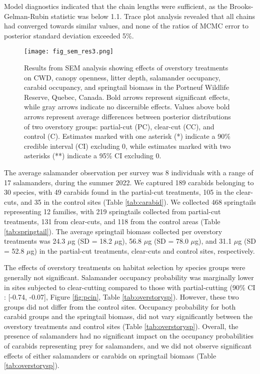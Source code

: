 Model diagnostics indicated that the chain lengths were sufficient, as the Brooks-Gelman-Rubin statistic was below 1.1. 
Trace plot analysis revealed that all chains had converged towards similar values, and none of the ratios of MCMC error to posterior standard deviation exceeded 5\%.

\vspace{10pt}

\begin{figure}[ht]
	\centering
	\texttt{[image: fig\_sem\_res3.png]}
	\caption[Results from structural equation modeling analysis revealing effects of overstory treatments on coarse woody debris volume,
  canopy openness, litter depth, salamander occupancy, carabid occupancy, and springtail biomass.]
  {Results from SEM analysis showing effects of overstory treatments on CWD, 
  canopy openness, litter depth, salamander occupancy, carabid occupancy, and springtail biomass in the Portneuf Wildlife Reserve, 
  Quebec, Canada. Bold arrows represent significant effects, while gray arrows indicate no discernible effects. 
  Values above bold arrows represent average differences between posterior distributions of two overstory groups: 
  partial-cut (PC), clear-cut (CC), and control (C). Estimates marked with one asterisk (*) 
  indicate a 90\% credible interval (CI) excluding 0, while estimates marked with two asterisks (**) indicate a 95\% CI excluding 0.}
	\label{fig:SEMres}
\end{figure}  

\vspace{10pt}

The average salamander observation per survey was 8 individuals with a range of 17 salamanders, during the summer 2022.
We captured 189 carabids belonging to 30 species, with 49 carabids found in the partial-cut treatments, 105 in the clear-cuts, and 35 in the control sites (Table \ref{tab:carabid}). 
We collected 468 springtails representing 12 families, with 219 springtails collected from partial-cut treatments, 131 from clear-cuts, and 118 from the control areas (Table \ref{tab:springtail}). 
The average springtail biomass collected per overstory treatments was 24.3 $\mu$g (SD = 18.2 $\mu$g), 56.8 $\mu$g (SD = 78.0 $\mu$g), and 31.1 $\mu$g (SD = 52.8 $\mu$g) in the partial-cut treatments, clear-cuts and control sites, respectively.

The effects of overstory treatments on habitat selection by species groups were generally not significant. 
Salamander occupancy probability was marginally lower in sites subjected to clear-cutting compared to those with partial-cutting (90\% CI : [-0.74, -0.07], Figure \ref{fig:pcin}, Table \ref{tab:overstorysp}). 
However, these two groups did not differ from the control sites. 
Occupancy probability for both carabid groups and the springtail biomass, did not vary significantly between the overstory treatments and control sites (Table \ref{tab:overstorysp}). 
Overall, the presence of salamanders had no significant impact on the occupancy probabilities of carabids representing prey for salamanders, and we did not observe significant effects of either salamanders or carabids on springtail biomass (Table \ref{tab:overstorysp}).

